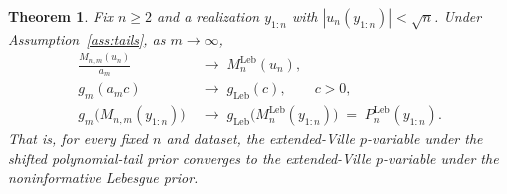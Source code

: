 \documentclass[numsec,webpdf,modern,medium,namedate]{oup-authoring-template}
\theoremstyle{thmstyleone}%
\newtheorem{theorem}{Theorem}%
\theoremstyle{thmstyletwo}%
\theoremstyle{thmstylethree}%
\newcommand{\Leb}{\mathrm{Leb}}
\newcommand{\1}{\mathbf{1}}
\begin{document}
\begin{theorem}\label{thm:recovery}
Fix \(n\geq 2\) and a realization \(y_{1:n}\) with
\(|u_n(y_{1:n})|<\sqrt n\). Under
Assumption~\ref{ass:tails}, as \(m\to\infty\),
\begin{align}
  \frac{M_{n,m}(u_n)}{a_m}
   &\;\longrightarrow\; M_n^{\Leb}(u_n),
   \label{eq:Mnm-asymp}\\
  g_m(a_m c)
   &\;\longrightarrow\; g_{\Leb}(c),\qquad c>0,
   \label{eq:gm-asymp}\\
  g_m\!\bigl(M_{n,m}(y_{1:n})\bigr)
   &\;\longrightarrow\;
   g_{\Leb}\!\bigl(M_n^{\Leb}(y_{1:n})\bigr)
   \;=\;P_n^{\Leb}(y_{1:n}).
   \label{eq:p-asymp}
\end{align}
That is, for every fixed \(n\) and dataset, the extended-Ville $p$-variable under the shifted polynomial-tail prior converges to the extended-Ville $p$-variable under the noninformative Lebesgue prior.
\end{theorem}
\end{document}
